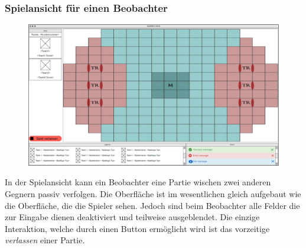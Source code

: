     \subsubsection{Spielansicht für einen Beobachter}
        
    \begin{figure}[H]
        \centering
        \includegraphics[width=\textwidth]{images/InGameObserver.PNG}
    \end{figure}

    In der Spielansicht kann ein Beobachter eine Partie wischen zwei anderen Gegnern passiv verfolgen. Die Oberfläche ist im wesentlichen gleich aufgebaut wie die Oberfläche, die die Spieler sehen. Jedoch sind beim Beobachter alle Felder die zur Eingabe dienen deaktiviert und teilweise ausgeblendet. Die einzige Interaktion, welche durch einen Button ermöglicht wird ist das vorzeitige \textit{verlassen} einer Partie.